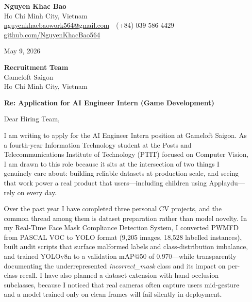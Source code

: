 \documentclass[11pt, a4paper]{article}
\begin{document}
\begin{flushleft}
\textbf{Nguyen Khac Bao}\\
Ho Chi Minh City, Vietnam\\
\href{mailto:nguyenkhacbaowork564@gmail.com}{nguyenkhacbaowork564@gmail.com} \,\textbullet\,
(+84) 039 586 4429 \,\textbullet\,
\href{https://github.com/NguyenKhacBao564}{github.com/NguyenKhacBao564}
\end{flushleft}

\vspace{4pt}
\hfill May 9, 2026

\vspace{8pt}

\begin{flushleft}
\textbf{Recruitment Team}\\
Gameloft Saigon\\
Ho Chi Minh City, Vietnam
\end{flushleft}

\vspace{4pt}

\textbf{Re: Application for AI Engineer Intern (Game Development)}

\vspace{8pt}

Dear Hiring Team,

I am writing to apply for the AI Engineer Intern position at Gameloft Saigon. As a fourth-year Information Technology student at the Posts and Telecommunications Institute of Technology (PTIT) focused on Computer Vision, I am drawn to this role because it sits at the intersection of two things I genuinely care about: building reliable datasets at production scale, and seeing that work power a real product that users---including children using Applaydu---rely on every day.

Over the past year I have completed three personal CV projects, and the common thread among them is dataset preparation rather than model novelty. In my Real-Time Face Mask Compliance Detection System, I converted PWMFD from PASCAL VOC to YOLO format (9{,}205 images, 18{,}528 labelled instances), built audit scripts that surface malformed labels and class-distribution imbalance, and trained YOLOv8n to a validation mAP@50 of 0.970---while transparently documenting the underrepresented \textit{incorrect\_mask} class and its impact on per-class recall. I have also planned a dataset extension with hand-occlusion subclasses, because I noticed that real cameras often capture users mid-gesture and a model trained only on clean frames will fail silently in deployment.
\end{document}

